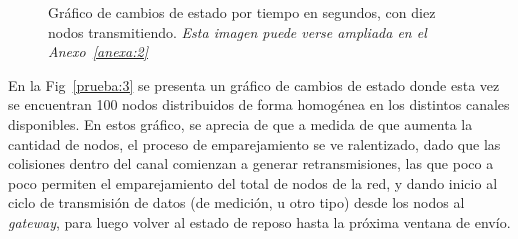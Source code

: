 \begin{justify}
\begin{figure}[!ht]
\caption{Gráfico de cambios de estado por tiempo en segundos, con diez nodos transmitiendo. \textit{Esta imagen puede verse ampliada en el Anexo~\ref{anexa:2}}}
\label{prueba:2}
\end{figure}
En la Fig~\ref{prueba:3} se presenta un gráfico de cambios de estado donde esta vez se encuentran 100 nodos distribuidos de forma homogénea en los distintos canales disponibles.\newpage \noindent
En estos gráfico, se aprecia de que a medida de que aumenta la cantidad de nodos, el proceso de emparejamiento se ve ralentizado, dado que las colisiones dentro del canal comienzan a generar retransmisiones, las que poco a poco permiten el emparejamiento del total de nodos de la red, y dando inicio al ciclo de transmisión de datos (de medición, u otro tipo) desde los nodos al \textit{gateway}, para luego volver al estado de reposo hasta la próxima ventana de envío.\\
\begin{figure}[!ht]
\centering

\end{figure}
\end{justify}

